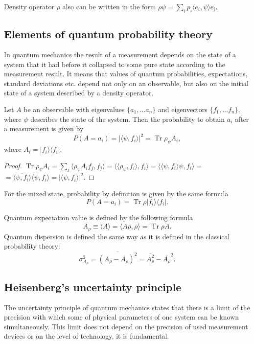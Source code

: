 \documentclass[%
master,         %
subf,           %
href,           %
colorlinks=true %
]{disser}
\DeclareMathOperator{\Tr}{Tr}
\numberwithin{equation}{section}
\numberwithin{figure}{section}
\begin{document}
Density operator $\rho$ also can be written in the form $\rho\psi = \sum_i p_i\langle e_i, \psi\rangle e_i$. 

\subsection{Elements of quantum probability theory}
In quantum mechanics the result of a measurement depends on the state of a system that it had before it collapsed to some pure state according to the measurement result. It means that values of quantum probabilities, expectations, standard deviations etc. depend not only on an observable, but also on the initial state of a system described by a density operator.

Let $A$ be an observable with eigenvalues $\{a_1,\ldots a_n\}$ and eigenvectors $\{f_1,\ldots f_n\}$, where $\psi$ describes the state of the system. Then the probability to obtain $a_i$ after a measurement is given by
\[
P(A = a_i) = |\langle\psi, f_i\rangle|^2 = \Tr \rho_\psi A_i,
\]
where $A_i = |f_i\rangle \langle f_i|$.
\begin{proof}
$\Tr \rho_\psi A_i = \sum_j \langle\rho_\psi A_if_j, f_j\rangle = \langle \langle\rho_\psi, f_i\rangle, f_i\rangle = \langle \langle \psi, f_i\rangle\psi, f_i\rangle = $\\
$= \overline{\langle\psi, f_i\rangle} \langle\psi, f_i\rangle = |\langle\psi, f_i\rangle|^2.$
\end{proof}
For the mixed state, probability by definition is given by the same formula
\[
P(A = a_i) = \Tr \rho |f_i\rangle \langle f_i|.
\]

Quantum expectation value is defined by the following formula
\[
\overline{A_\rho} \equiv \langle A\rangle = \langle A\rho, \rho\rangle = \Tr\rho A.
\]
Quantum dispersion is defined the same way as it is defined in the classical probability theory:
\[
\sigma^2_{A_\rho} = \overline{\left(A_\rho - \overline{A_\rho}\right)^2} = \overline{A^2_\rho} - \overline{A_\rho}^2.
\] 

\subsection{Heisenberg's uncertainty principle}
The uncertainty principle of quantum mechanics states that there is a limit of the precision with which some of physical parameters of one system can be known simultaneously. This limit does not depend on the precision of used measurement devices or on the level of technology, it is fundamental.
\end{document}
